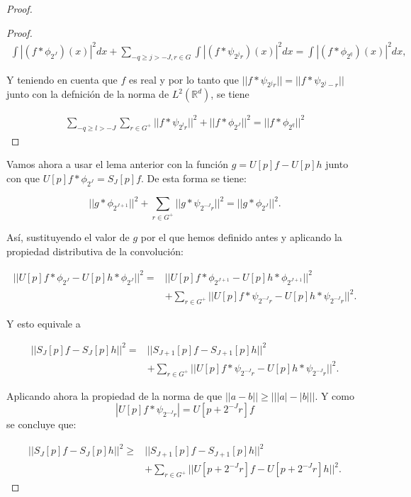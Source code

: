 \begin{proof}
\begin{proof}
  \begin{align*}
    \int \left|(f \ast \phi_{2^J}) (x)\right|^2 dx + \sum_{-q \geq j >-J,r \in G} \int \left|(f \ast \psi_{2^{j}r})(x)\right|^2 dx=\int \left|(f \ast \phi_{2^q}) (x)\right|^2 dx,
  \end{align*}

  \noindent Y teniendo en cuenta que $f$ es real y por lo tanto que $||f \ast \psi_{2^j r}||= ||f \ast \psi_{2^j -r}||$ junto con la defnición de la norma de $L^2(\mathbb{R}^d)$, se tiene  

  \begin{align*}
    \sum_{-q\geq l > -J} \sum_{r \in G^+} || f \ast \psi_{2^lr}||^2 + || f \ast \phi_{2^J}||^2 = || f \ast \phi_{2^q} ||^2
  \end{align*}

\end{proof}


Vamos ahora a usar el lema anterior con la función $g=U[p]f-U[p]h$ junto con que $U[p]f\ast \phi_{2^J}=S_J[p]f$. De esta forma se tiene:

$$||g \ast \phi_{2^{J+1}} ||^2 + \sum_{r\in G^+} || g\ast \psi_{2^{-J}r} ||^2=||g \ast \phi_{2^J}||^2.$$

\noindent Así, sustituyendo el valor de $g$ por el que hemos definido antes y aplicando la propiedad distributiva de la convolución:

\begin{align*}
  ||U[p]f \ast \phi_{2^J} -U[p]h \ast \phi_{2^J}||^2 = &||U[p]f \ast \phi_{2^{J+1}} - U[p]h \ast \phi_{2^{J+1}} ||^2 \\
  & + \sum_{r\in G^+} || U[p]f\ast \psi_{2^{-J}r} -U[p]h \ast \psi_{2^{-J}r}||^2.
\end{align*}

\noindent Y esto equivale a

\begin{align*}
  ||S_{J}[p]f-S_J[p]h||^2 = &|| S_{J+1}[p]f-S_{J+1}[p]h||^2 \\
  & + \sum_{r\in G^+} || U[p]f\ast \psi_{2^{-J}r} -U[p]h \ast \psi_{2^{-J}r}||^2.
\end{align*}

\noindent Aplicando ahora la propiedad de la norma de que $\left|\left|a - b \right|\right| \geq \left|\left| |a| - |b| \right|\right|$. Y como $$|U[p]f\ast\psi_{2^{-J}r}|=U[p+2^{-J}r]f$$ se concluye que:

\begin{align*}
    ||S_{J}[p]f-S_J[p]h||^2 \geq & || S_{J+1}[p]f-S_{J+1}[p]h||^2 \\
    & + \sum_{r\in G^+} ||U[p+2^{-J}r]f-U[p+2^{-J}r]h||^2.
\end{align*}



\end{proof}
